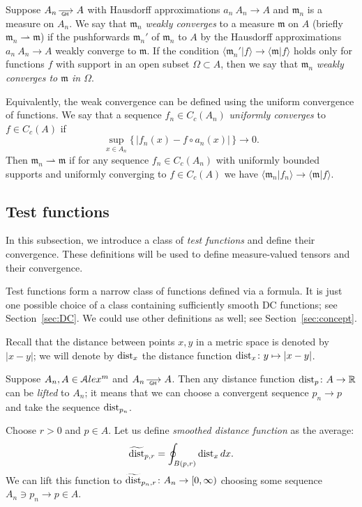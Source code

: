 Suppose $A_n\GHto A$ with Hausdorff approximations $a_n\:A_n\to A$ and
$\mathfrak m_n$ is a measure on $A_n$.
We say that $\mathfrak m_n$ \emph{weakly converges} to a measure $\mathfrak m$ on $A$ (briefly $\mathfrak m_n\rightharpoonup \mathfrak m$) if the pushforwards $\mathfrak m_n'$ of $\mathfrak m_n$ to $A$  by the Hausdorff approximations $a_n\:A_n\to A$ weakly converge to 
$\mathfrak m$.
If the condition $\langle \mathfrak m_n'|f\rangle \to \langle \mathfrak m|f\rangle $ holds only for functions $f$ with support in an open subset $\Omega\subset A$, then we say that $\mathfrak m_n$ \emph{weakly converges to $\mathfrak m$ in $\Omega$}.

Equivalently, the weak convergence can be defined using the uniform convergence of functions.
We say that  a sequence $f_n\in C_c(A_n)$
\emph{uniformly converges} to $f\in C_c(A)$
if 
\[\sup_{x\in A_n}\{\,|f_n(x)-f\circ a_n(x)|\,\}\to 0.\]
Then  $\mathfrak m_n\rightharpoonup \mathfrak m$
if for any sequence $f_n\in C_c(A_n)$
with uniformly bounded supports and
uniformly converging to $f\in C_c(A)$
we have $\langle \mathfrak m_n|f_n\rangle \to \langle \mathfrak m|f\rangle $.


\subsection{Test functions}

In this subsection, we introduce a class of \emph{test functions} and define their convergence.
These definitions will be used to define measure-valued tensors and their convergence.

Test functions form a narrow class of functions defined via a formula.
It is just one possible choice of a class containing sufficiently smooth DC functions; see Section~\ref{sec:DC}.
We could use other definitions as well; see Section~\ref{sec:concept}.

Recall that the distance between points $x,y$ in a metric space is denoted by $|x-y|$;
we will denote by $\operatorname{\rm dist}_x$ the distance function $\operatorname{\rm dist}_x\colon y\mapsto |x-y|$.

Suppose $A_n, A\in \mathcal{A}lex^m$ and  $A_n\GHto A$.
Then any distance function $\dist_p\:A\zz\to\RR$ can be \emph{lifted} to $A_n$;
it means that we can choose a convergent sequence $p_n\to p$ and take the
sequence $\operatorname{\rm dist}_{p_n}$.

Choose $r>0$ and $p\in A$.
Let us define \emph{smoothed distance function} as the average:
$$\widetilde{\operatorname{\rm dist}}_{p,r} =\oint_{B(p,r)} \operatorname{\rm dist}_{x}dx.$$ 
We can lift this function to
$\widetilde{\operatorname{\rm dist}}_{p_n,r}\colon A_n\to [0,\infty)$
choosing some  sequence $A_n\ni p_n\to p\in A$.

